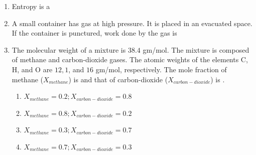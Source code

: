 \documentclass[a4paper,10pt]{article}
\begin{document}
\begin{enumerate}
    \item Entropy is a
    
    \hfill{}
    \begin{enumerate}
    \end{enumerate}

    \item A small container has gas at high pressure. It is placed in an evacuated space. If the container is punctured, work done by the gas is
    
    \hfill{}
    \begin{enumerate}
    \end{enumerate}

    \item The molecular weight of a mixture is $38.4$ gm/mol. The mixture is composed of methane and carbon-dioxide gases. The atomic weights of the elements C, H, and O are $12, 1$, and $16$ gm/mol, respectively. The mole fraction of methane ($X_{methane}$) is \underline{\hspace{2cm}} and that of carbon-dioxide ($X_{carbon-dioxide}$) is \underline{\hspace{2cm}}.
    
    \hfill{}
    \begin{enumerate}
        \item $X_{methane} = 0.2; X_{carbon-dioxide} = 0.8$
        \item $X_{methane} = 0.8; X_{carbon-dioxide} = 0.2$
        \item $X_{methane} = 0.3; X_{carbon-dioxide} = 0.7$
        \item $X_{methane} = 0.7; X_{carbon-dioxide} = 0.3$
    \end{enumerate}


\end{enumerate}
\end{document}

